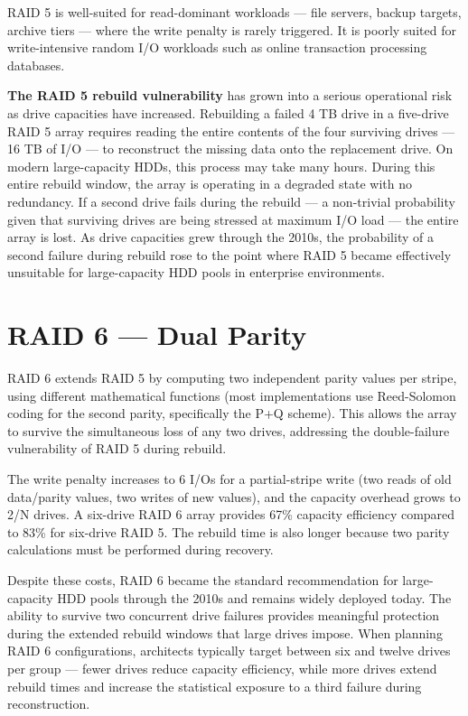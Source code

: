 RAID 5 is well-suited for read-dominant workloads --- file servers, backup targets, archive tiers --- where the write penalty is rarely triggered. It is poorly suited for write-intensive random I/O workloads such as online transaction processing databases.

\textbf{The RAID 5 rebuild vulnerability} has grown into a serious operational risk as drive capacities have increased. Rebuilding a failed 4 TB drive in a five-drive RAID 5 array requires reading the entire contents of the four surviving drives --- 16 TB of I/O --- to reconstruct the missing data onto the replacement drive. On modern large-capacity HDDs, this process may take many hours. During this entire rebuild window, the array is operating in a degraded state with no redundancy. If a second drive fails during the rebuild --- a non-trivial probability given that surviving drives are being stressed at maximum I/O load --- the entire array is lost. As drive capacities grew through the 2010s, the probability of a second failure during rebuild rose to the point where RAID 5 became effectively unsuitable for large-capacity HDD pools in enterprise environments.

\section{RAID 6 --- Dual Parity}
RAID 6 extends RAID 5 by computing two independent parity values per stripe, using different mathematical functions (most implementations use Reed-Solomon coding for the second parity, specifically the P+Q scheme). This allows the array to survive the simultaneous loss of any two drives, addressing the double-failure vulnerability of RAID 5 during rebuild.

The write penalty increases to 6 I/Os for a partial-stripe write (two reads of old data/parity values, two writes of new values), and the capacity overhead grows to 2/N drives. A six-drive RAID 6 array provides 67\% capacity efficiency compared to 83\% for six-drive RAID 5. The rebuild time is also longer because two parity calculations must be performed during recovery.

Despite these costs, RAID 6 became the standard recommendation for large-capacity HDD pools through the 2010s and remains widely deployed today. The ability to survive two concurrent drive failures provides meaningful protection during the extended rebuild windows that large drives impose. When planning RAID 6 configurations, architects typically target between six and twelve drives per group --- fewer drives reduce capacity efficiency, while more drives extend rebuild times and increase the statistical exposure to a third failure during reconstruction.

